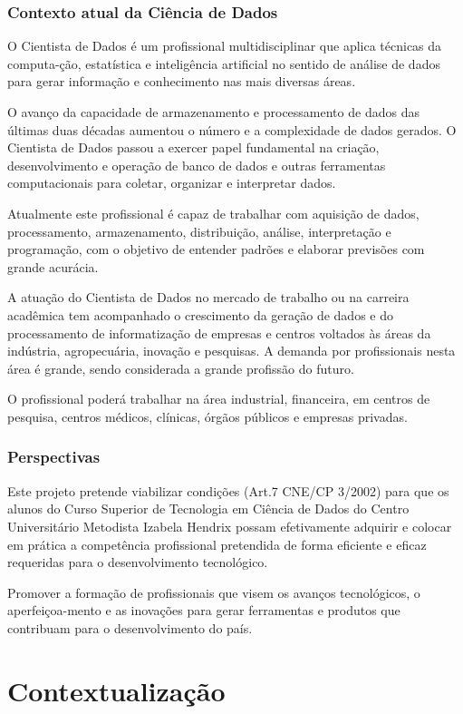 \documentclass[a4paper, 12pt, openright, oneside, german, french, english, brazil]{abntex2}
\begin{document}
\subsection{Contexto atual da Ciência de Dados}

O Cientista de Dados é um profissional multidisciplinar que aplica técnicas da computa-ção, estatística e inteligência artificial no sentido de análise de dados para gerar informação e conhecimento nas mais diversas áreas.

O avanço da capacidade de armazenamento e processamento de dados das últimas duas décadas aumentou o número e a complexidade de dados gerados. O Cientista de Dados passou a exercer papel fundamental na criação, desenvolvimento e operação de banco de dados e outras ferramentas computacionais para coletar, organizar e interpretar dados.

Atualmente este profissional é capaz de trabalhar com aquisição de dados, processamento, armazenamento, distribuição, análise, interpretação e programação, com o objetivo de entender padrões e elaborar previsões com grande acurácia.

A atuação do Cientista de Dados no mercado de trabalho ou na carreira acadêmica tem acompanhado o crescimento da geração de dados e do processamento de informatização de empresas e centros voltados às áreas da indústria, agropecuária, inovação e pesquisas. A demanda por profissionais nesta área é grande, sendo considerada a grande profissão do futuro.

O profissional poderá trabalhar na área industrial, financeira, em centros de pesquisa, centros médicos, clínicas, órgãos públicos e empresas privadas.

\subsection{Perspectivas}

Este projeto pretende viabilizar condições (Art.7 CNE/CP 3/2002) para que os alunos do Curso Superior de Tecnologia em Ciência de Dados do Centro Universitário Metodista Izabela Hendrix possam efetivamente adquirir e colocar em prática a competência profissional pretendida de forma eficiente e eficaz requeridas para o desenvolvimento tecnológico.

Promover a formação de profissionais que visem os avanços tecnológicos, o aperfeiçoa-mento e as inovações para gerar ferramentas e produtos que contribuam para o desenvolvimento do país.


\chapter{Contextualização}
\end{document}
